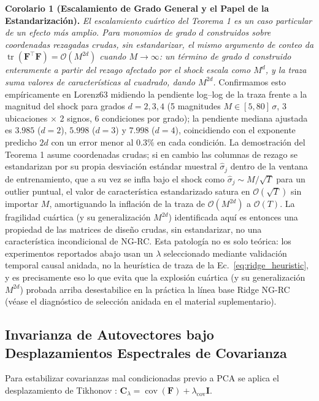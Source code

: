 \documentclass[aip,cha,reprint,amsmath,amssymb]{revtex4-2}
\begin{document}
\textbf{Corolario 1 (Escalamiento de Grado General y el Papel de la Estandarización).} \emph{El escalamiento cuártico del Teorema 1 es un caso particular de un efecto más amplio. Para monomios de grado $d$ construidos sobre coordenadas rezagadas crudas, sin estandarizar, el mismo argumento de conteo da $\operatorname{tr}(\mathbf{F}^\top\mathbf{F}) = \mathcal{O}(M^{2d})$ cuando $M \to \infty$: un término de grado $d$ construido enteramente a partir del rezago afectado por el shock escala como $M^d$, y la traza suma valores de características al cuadrado, dando $M^{2d}$.} Confirmamos esto empíricamente en Lorenz63 midiendo la pendiente log--log de la traza frente a la magnitud del shock para grados $d=2,3,4$ (5 magnitudes $M \in [5,80]\,\sigma$, 3 ubicaciones $\times$ 2 signos, 6 condiciones por grado); la pendiente mediana ajustada es $3.985$ ($d=2$), $5.998$ ($d=3$) y $7.998$ ($d=4$), coincidiendo con el exponente predicho $2d$ con un error menor al $0.3\%$ en cada condición. La demostración del Teorema 1 asume coordenadas crudas; si en cambio las columnas de rezago se estandarizan por su propia desviación estándar muestral $\hat\sigma_j$ dentro de la ventana de entrenamiento, que a su vez se infla bajo el shock como $\hat\sigma_j \sim M/\sqrt{T}$ para un outlier puntual, el valor de característica estandarizado satura en $\mathcal{O}(\sqrt{T})$ sin importar $M$, amortiguando la inflación de la traza de $\mathcal{O}(M^{2d})$ a $\mathcal{O}(T)$. La fragilidad cuártica (y su generalización $M^{2d}$) identificada aquí es entonces una propiedad de las matrices de diseño crudas, sin estandarizar, no una característica incondicional de NG-RC. Esta patología no es solo teórica: los experimentos reportados abajo usan un $\lambda$ seleccionado mediante validación temporal causal anidada, no la heurística de traza de la Ec.~\eqref{eq:ridge_heuristic}, y es precisamente eso lo que evita que la explosión cuártica (y su generalización $M^{2d}$) probada arriba desestabilice en la práctica la línea base Ridge NG-RC (véase el diagnóstico de selección anidada en el material suplementario).

\subsection{Invarianza de Autovectores bajo Desplazamientos Espectrales de Covarianza}

Para estabilizar covarianzas mal condicionadas previo a PCA se aplica el desplazamiento de Tikhonov \cite{tikhonovarsenin1977solutions}: $\mathbf{C}_\lambda = \operatorname{cov}(\mathbf{F}) + \lambda_{\text{cov}}\mathbf{I}$.
\end{document}
